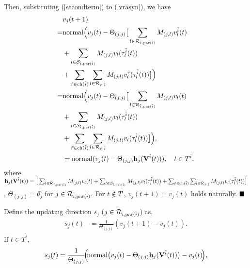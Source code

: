 \documentclass[journal]{IEEEtran}
\begin{document}
\par Then, substituting (\ref{secondterm}) to (\ref{vrasyn}), we have
\begin{align}\label{ljasy}
&v_j(t+1)\notag\\
=&{\rm normal}\Big(v_j(t)-\Theta_{(j,j)} \big[\sum_{l\in \mathcal{R}_{\tilde{i},{\rm par}(\tilde{i})}} M_{(j,l)} {v}_l^{\tilde{i}}(t)\notag\\
&+\sum_{l\in \mathcal{S}_{\tilde{i},{\rm par}(\tilde{i})}} M_{(j,l)} {v}_l(\tau_{l}^{\tilde{i}}(t))\notag\\
&+\sum_{\tilde{r}\in {\rm ch}(\tilde{i})}\sum_{l\in \mathcal{R}_{\tilde{r},\tilde{i}}} M_{(j,l)} v_l^{\tilde{r}}(\tau_{l}^{\tilde{i}}(t))\big]\Big)\notag\\
=&{\rm normal}\Big(v_j(t)-\Theta_{(j,j)}\big[\sum_{l\in \mathcal{R}_{\tilde{i},{\rm par}(\tilde{i})}} M_{(j,l)} {v}_l(t)\notag\\
&+\sum_{l\in \mathcal{S}_{\tilde{i},{\rm par}(\tilde{i})}} M_{(j,l)} {v}_l(\tau_{l}^{\tilde{i}}(t))\notag\\
&+\sum_{\tilde{r}\in {\rm ch}(\tilde{i})}\sum_{l\in \mathcal{R}_{\tilde{r},\tilde{i}}} M_{(j,l)} v_l(\tau_{l}^{\tilde{i}}(t))\big]\Big),\notag\\
&={\rm normal}(v_j(t)-\Theta_{(j,j)} \mathbf{h}_j(\mathbf{V}^{\tilde{i}}(t))), \quad t\in T^{\tilde{i}},
\end{align}
where {$\mathbf{h}_j(\mathbf{V}^{\tilde{i}}(t))= \big[\sum_{l\in \mathcal{R}_{\tilde{i},{\rm par}(\tilde{i})}} M_{(j,l)} {v}_l(t)+\sum_{l\in \mathcal{S}_{\tilde{i},{\rm par}(\tilde{i})}} M_{(j,l)} {v}_l(\tau_{l}^{\tilde{i}}(t))+\sum_{\tilde{r}\in {\rm ch}(\tilde{i})}\sum_{l\in \mathcal{R}_{\tilde{r},\tilde{i}}} M_{(j,l)} v_l(\tau_{l}^{\tilde{i}}(t))\big]$}, $\Theta_{(j,j)}=\theta_j^{\tilde{i}}$ for $j\in \mathcal{R}_{\tilde{i},{\rm par}(\tilde{i})}$. For $t\notin T^{\tilde{i}}$, $v_j(t+1)=v_j(t)$ holds naturally.
$\hfill\blacksquare$
\par Define the updating direction $s_j$ ($j\in \mathcal{R}_{\tilde{i},{\rm par}(\tilde{i})}$) as, %
\begin{align}\label{s_de}
s_j(t)&=\frac{1}{\Theta_{(j,j)}}(v_j(t+1)-v_j(t)).
\end{align}
If $t\in T^{\tilde{i}}$, 
\begin{align}
s_j(t)=\frac{1}{\Theta_{(j,j)}}\!\Big(\!{\rm normal}\big(v_j(t)-\Theta_{(j,j)}\mathbf{h}_j(\mathbf{V}^{\tilde{i}}(t))\big)-v_j(t)\!\Big),
\end{align}
\end{document}
